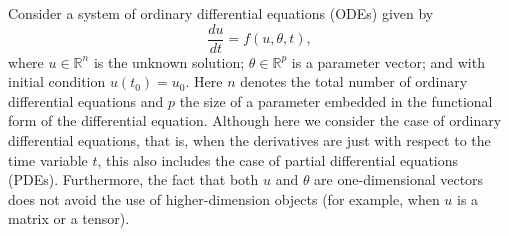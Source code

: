Consider a system of ordinary differential equations (ODEs) given by
\begin{equation}
 \frac{du}{dt} = f(u, \theta, t),
 \label{eq:original_ODE}
\end{equation}
where $u \in \mathbb{R}^n$ is the unknown solution; $\theta \in \mathbb R^p$ is a parameter vector; and with initial condition $u(t_0) = u_0$.
Here $n$ denotes the total number of ordinary differential equations and $p$ the size of a parameter embedded in the functional form of the differential equation.
Although here we consider the case of ordinary differential equations, that is, when the derivatives are just with respect to the time variable $t$, this also includes the case of partial differential equations (PDEs).
Furthermore, the fact that both $u$ and $\theta$ are one-dimensional vectors does not avoid the use of higher-dimension objects (for example, when $u$ is a matrix or a tensor). 

